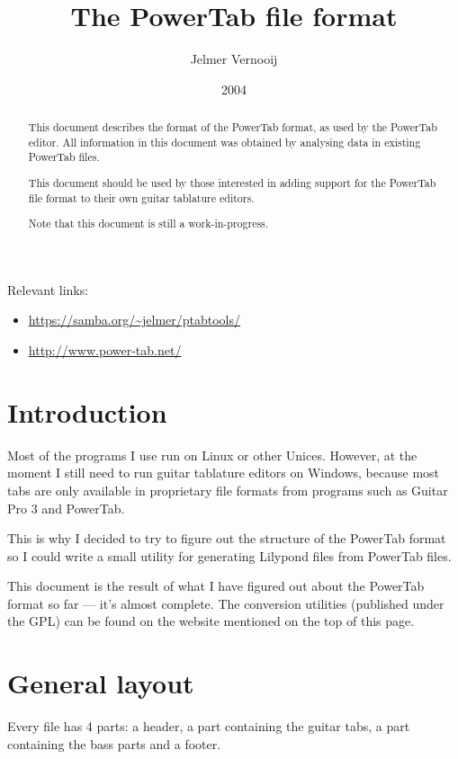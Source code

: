 \documentclass[a4paper]{article}
\begin{document}
\title{The PowerTab file format}
\date{2004}
\author{Jelmer Vernooij}
\maketitle

Relevant links:

\begin{itemize}
\item \url{https://samba.org/~jelmer/ptabtools/}
\item \url{http://www.power-tab.net/}
\end{itemize}

\begin{abstract}
This document describes the format of the PowerTab format, as 
used by the PowerTab editor. All information 
in this document was obtained by analysing data in existing PowerTab files.

This document should be used by those interested in adding support 
for the PowerTab file format to their own guitar tablature editors.

Note that this document is still a work-in-progress.
\end{abstract}

\section{Introduction}

Most of the programs I use run on Linux or other Unices. However, 
at the moment I still need to run guitar tablature editors on Windows, 
because most tabs are only available in proprietary file formats from 
programs such as Guitar Pro 3 and PowerTab.

This is why I decided to try to figure out the structure of the PowerTab 
format so I could write a small utility for generating Lilypond files 
from PowerTab files.

This document is the result of what I have figured out about the PowerTab 
format so far --- it's almost complete. The conversion utilities 
(published under the GPL) can be found on the website mentioned on the top of 
this page.

\section{General layout}

Every file has 4 parts: a header, a part containing the guitar tabs, a 
part containing the bass parts and a footer.
\end{document}
